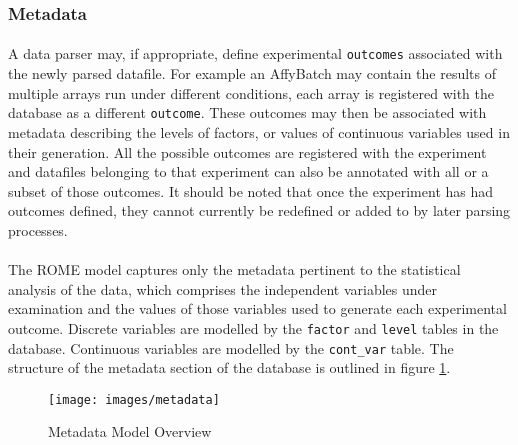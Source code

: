 \subsubsection{Metadata}
\label{sec:model_metadata}

\paragraph{}
A data parser may, if appropriate, define experimental \texttt{outcomes} associated with the newly parsed datafile. For example an AffyBatch may contain the results of multiple arrays run under different conditions, each array is registered with the database as a different \texttt{outcome}. These outcomes may then be associated with metadata describing the levels of factors, or values of continuous variables used in their generation. All the possible outcomes are registered with the experiment and datafiles belonging to that experiment can also be annotated with all or a subset of those outcomes. It should be noted that once the experiment has had outcomes defined, they cannot currently be redefined or added to by later parsing processes.

\paragraph{}
The ROME model captures only the metadata pertinent to the statistical analysis of the data, which comprises the independent variables under examination and the values of those variables used to generate each experimental outcome. Discrete variables are modelled by the \texttt{factor} and \texttt{level} tables in the database. Continuous variables are modelled by the \texttt{cont\_var} table. The structure of the metadata section of the database is outlined in figure \ref{fig:metadata_mod}. 

\begin{figure}
\centering
\caption{Metadata Model Overview}\label{fig:metadata_mod}
\texttt{[image: images/metadata]}
\end{figure}


